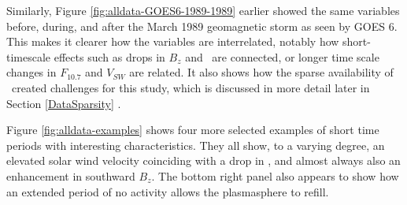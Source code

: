 Similarly, Figure \ref{fig:alldata-GOES6-1989-1989} earlier showed the same variables before, during, and after the March 1989 geomagnetic storm as seen by GOES 6. This makes it clearer how the variables are interrelated, notably how short-timescale effects such as drops in $B_z$ and \dst\ are connected, or longer time scale changes in $F_{10.7}$ and $V_{SW}$ are related. It also shows how the sparse availability of \req\ created challenges for this study, which is discussed in more detail later in Section \ref{DataSparsity} . 

Figure \ref{fig:alldata-examples} shows four more selected examples of short time periods with interesting characteristics. They all show, to a varying degree, an elevated solar wind velocity coinciding with a drop in \dst, and almost always also an enhancement in southward $B_z$. The bottom right panel also appears to show how an extended period of no activity allows the plasmasphere to refill.


